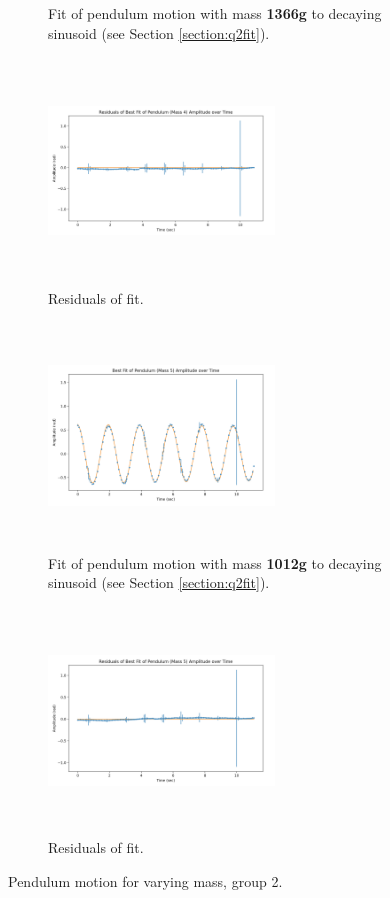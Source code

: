 \documentclass[12pt]{article}
\begin{document}
\begin{figure}[h]
\begin{subfigure}[b]{0.48\textwidth}
        \caption{Fit of pendulum motion with mass \textbf{1366g} to decaying sinusoid (see Section \ref{section:q2fit}).}
    \end{subfigure}
    \hfill
    \begin{subfigure}[b]{0.48\textwidth}
        \centering
        \includegraphics[width=6cm,height=6cm, keepaspectratio]{q4b_residuals4.png}
        \caption{Residuals of fit.}
    \end{subfigure}
    \begin{subfigure}[b]{0.48\textwidth}
        \centering
        \includegraphics[width=6cm,height=6cm, keepaspectratio]{q4b_fit5.png}
        \caption{Fit of pendulum motion with mass \textbf{1012g} to decaying sinusoid (see Section \ref{section:q2fit}).}
    \end{subfigure}
    \hfill
    \begin{subfigure}[b]{0.48\textwidth}
        \centering
        \includegraphics[width=6cm,height=6cm, keepaspectratio]{q4b_residuals5.png}
        \caption{Residuals of fit.}
    \end{subfigure}
    \hfill
    \caption{Pendulum motion for varying mass, group 2.}
    \label{fig:q4bfig2}
\end{figure}
\pagebreak
\end{document}
